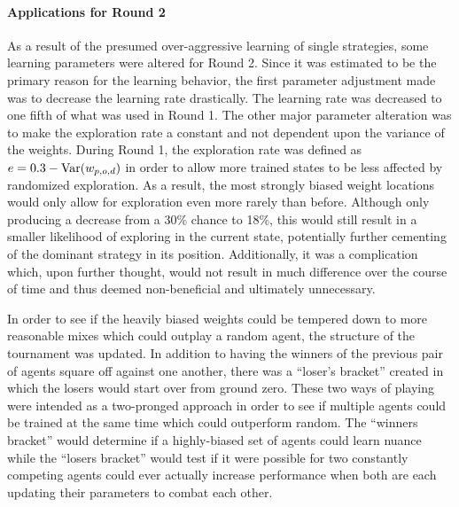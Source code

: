 




\paragraph*{Applications for Round 2}



As a result of the presumed over-aggressive learning of single strategies,
some learning parameters were altered for Round 2.
%
Since it was estimated to be the primary reason for the learning behavior,
the first parameter adjustment made was to decrease the learning rate drastically.
%
The learning rate was decreased to one fifth of what was used in Round 1.
%
The other major parameter alteration was to make the exploration rate a constant
and not dependent upon the variance of the weights.
%
During Round 1,
the exploration rate was defined as $e = 0.3 - \mathrm{Var}({w_{p,o,d}})$
in order to allow more trained states to be less affected by randomized
exploration.
%
As a result,
the most strongly biased weight locations would only allow for exploration
even more rarely than before.
%
Although only producing a decrease from a 30\% chance to 18\%,
this would still result in a smaller likelihood of exploring in the current 
state,
potentially further cementing of the dominant strategy in its position.
%
Additionally,
it was a complication which, upon further thought, would not result in much
difference over the course of time
and thus deemed non-beneficial and ultimately unnecessary.


In order to see if the heavily biased weights could be tempered down to more
reasonable mixes which could outplay a random agent,
the structure of the tournament was updated.
%
In addition to having the winners of the previous pair of agents square
off against one another,
there was a ``loser's bracket'' created
in which the losers would start over from ground zero.
%
These two ways of playing were intended as a two-pronged approach
in order to see if multiple agents could be trained at the same time
which could outperform random.
%
The ``winners bracket'' would determine if a highly-biased set of agents could
learn nuance
while the ``losers bracket'' would test if it were possible for two constantly
competing agents could ever actually increase performance when both are each
updating their parameters to combat each other.

